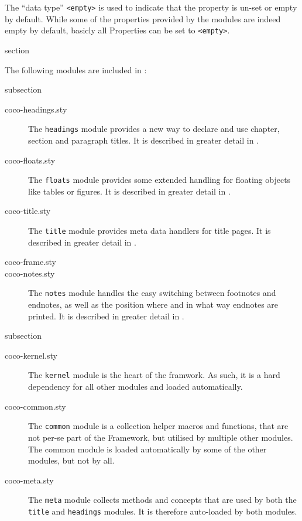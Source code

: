 The “data type” \texttt{<empty>} is used to indicate that the property
is un-set or empty by default. While some of the properties provided
by the {\CoCoTeX} modules are indeed empty by default, basicly all
Properties can be set to \texttt{<empty>}.


\begin{heading}[label=sec:modules]{section}
\end{heading}

The following modules are included in {\CoCoTeX}:

\begin{heading}{subsection}
\end{heading}

\begin{description}
\item[\ttfamily coco-headings.sty] The \lstinline{headings}
  module provides a new way to declare and
  use chapter, section and paragraph titles. It is described in
  greater detail in .
\item[\ttfamily coco-floats.sty] The \lstinline{floats}
  module provides some extended handling for
  floating objects like tables or figures. It is described in greater
  detail in .
\item[\ttfamily coco-title.sty] The
  \lstinline{title} module provides meta data
  handlers for title pages. It is described in greater detail in
  .
\item[\ttfamily coco-frame.sty] 
\item[\ttfamily coco-notes.sty] The \lstinline{notes}
  module handles the easy switching between
  footnotes and endnotes, as well as the position where and in what
  way endnotes are printed. It is described in greater detail in
  .
\end{description}

\begin{heading}{subsection}
\end{heading}

\begin{description}
\item[\ttfamily coco-kernel.sty] The \lstinline{kernel}
  module is the heart of the {\CoCoTeX}
  framwork. As such, it is a hard dependency for all other modules and
  loaded automatically.
\item[\ttfamily coco-common.sty] The \lstinline{common}
  module is a collection helper macros and
  functions, that are not per-se part of the {\CoCoTeX} Framework, but
  utilised by multiple other modules. The common module is loaded
  automatically by some of the other modules, but not by all.
\item[\ttfamily coco-meta.sty] The \lstinline{meta}
  module collects methods and concepts that are
  used by both the \lstinline{title} and \lstinline{headings}
  modules. It is therefore auto-loaded by both modules.
\end{description}


